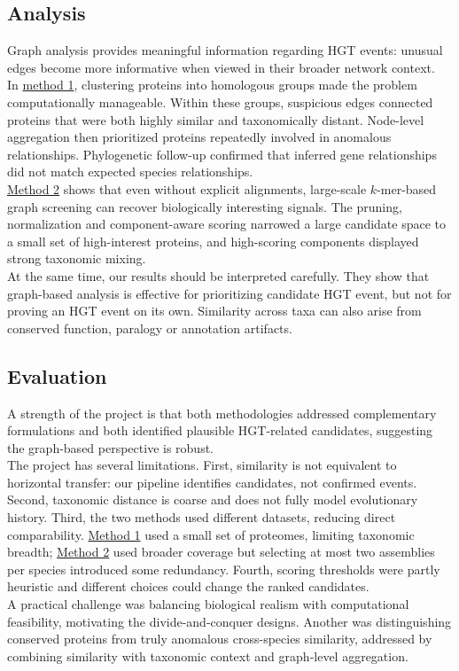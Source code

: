 \documentclass[11pt]{article}
\begin{document}
	\subsection{Analysis}
	Graph analysis provides meaningful information regarding HGT events: unusual edges become more informative when viewed in their broader network context.\\
	In \hyperref[subsec:method1]{method 1}, clustering proteins into homologous groups made the problem computationally manageable. Within these groups, suspicious edges connected proteins that were both highly similar and taxonomically distant. Node-level aggregation then prioritized proteins repeatedly involved in anomalous relationships. Phylogenetic follow-up confirmed that inferred gene relationships did not match expected species relationships.\\
	\hyperref[subsec:method2]{Method 2} shows that even without explicit alignments, large-scale $k$-mer-based graph screening can recover biologically interesting signals. The pruning, normalization and component-aware scoring narrowed a large candidate space to a small set of high-interest proteins, and high-scoring components displayed strong taxonomic mixing.\\
	At the same time, our results should be interpreted carefully. They show that graph-based analysis is effective for prioritizing candidate HGT event, but not for proving an HGT event on its own. Similarity across taxa can also arise from conserved function, paralogy or annotation artifacts.
	
	\subsection{Evaluation}
	A strength of the project is that both methodologies addressed complementary formulations and both identified plausible HGT-related candidates, suggesting the graph-based perspective is robust.\\
	The project has several limitations. First, similarity is not equivalent to horizontal transfer: our pipeline identifies candidates, not confirmed events. Second, taxonomic distance is coarse and does not fully model evolutionary history. Third, the two methods used different datasets, reducing direct comparability. \hyperref[subsec:method1]{Method 1} used a small set of proteomes, limiting taxonomic breadth; \hyperref[subsec:method2]{Method 2} used broader coverage but selecting at most two assemblies per species introduced some redundancy. Fourth, scoring thresholds were partly heuristic and different choices could change the ranked candidates.\\
	A practical challenge was balancing biological realism with computational feasibility, motivating the divide-and-conquer designs. Another was distinguishing conserved proteins from truly anomalous cross-species similarity, addressed by combining similarity with taxonomic context and graph-level aggregation.
	
\end{document}
